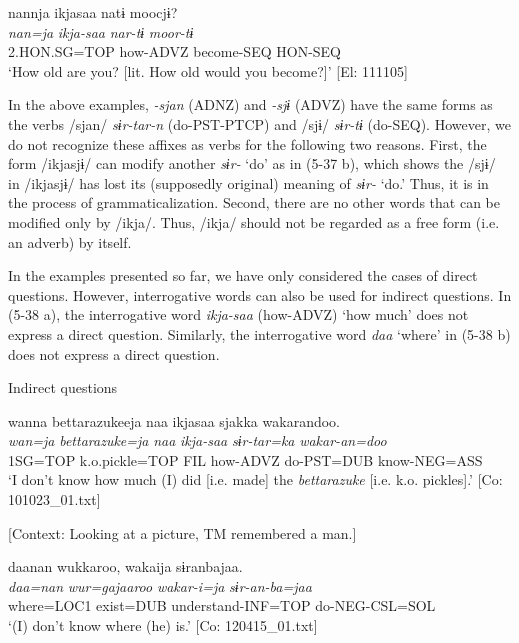  \ex \label{ex:5:c} %
\glll  nannja  ikjasaa  natɨ  moocjɨ?\\
\textit{nan=ja}  \textit{ikja-saa}  \textit{nar-tɨ}  \textit{moor-tɨ}\\
2.HON.SG=TOP  how-ADVZ  become-SEQ  HON-SEQ\\
\glt ‘How old are you? [lit. How old would you become?]’ [El: 111105]
\z
\z

In the above examples, \textit{{}-sjan} (ADNZ) and \textit{{}-sjɨ} (ADVZ) have the same forms as the verbs /sjan/ \textit{sɨr-tar-n} (do-PST-PTCP) and /sjɨ/ \textit{sɨr-tɨ} (do-SEQ). However, we do not recognize these affixes as verbs for the following two reasons. First, the form /ikjasjɨ/ can modify another \textit{sɨr-} ‘do’ as in (5-37 b), which shows the /sjɨ/ in /ikjasjɨ/ has lost its (supposedly original) meaning of \textit{sɨr-} ‘do.’ Thus, it is in the process of grammaticalization. Second, there are no other words that can be modified only by /ikja/. Thus, /ikja/ should not be regarded as a free form (i.e. an adverb) by itself.

  In the examples presented so far, we have only considered the cases of direct questions. However, interrogative words can also be used for indirect questions. In (5-38 a), the interrogative word \textit{ikja-saa} (how-ADVZ) ‘how much’ does not express a direct question. Similarly, the interrogative word \textit{daa} ‘where’ in (5-38 b) does not express a direct question.

\ea \label{ex:5:38}   Indirect questions

 \ea \label{ex:5:a} %
\glll  wanna  {\textbar}bettarazukee{\textbar}ja  naa  ikjasaa  sjakka  wakarandoo.\\
\textit{wan=ja}  \textit{bettarazuke=ja}  \textit{naa}  \textit{ikja-saa}  \textit{sɨr-tar=ka}  \textit{wakar-an=doo}\\
1SG=TOP  k.o.pickle=TOP  FIL  how-ADVZ  do-PST=DUB  know-NEG=ASS\\
\glt ‘I don’t know how much (I) did [i.e. made] the \textit{bettarazuke} [i.e. k.o. pickles].’ [Co: 101023\_01.txt]

 \ex \label{ex:5:b} [Context: Looking at a picture, TM remembered a man.]

\glll  daanan  wukkaroo,  wakaija  sɨranbajaa.\\
\textit{daa=nan}  \textit{wur=gajaaroo}  \textit{wakar-i=ja}  \textit{sɨr-an-ba=jaa}\\
where=LOC1  exist=DUB  understand-INF=TOP  do-NEG-CSL=SOL\\
\glt ‘(I) don’t know where (he) is.’ [Co: 120415\_01.txt]
\z
\z

